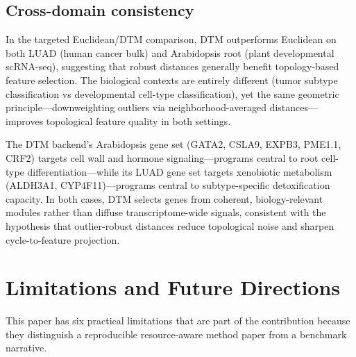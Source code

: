\documentclass[11pt]{article}
\begin{document}
\subsection{Cross-domain consistency}

In the targeted Euclidean/DTM comparison, DTM outperforms Euclidean on both LUAD (human cancer bulk) and Arabidopsis root (plant developmental scRNA-seq), suggesting that robust distances generally benefit topology-based feature selection.
The biological contexts are entirely different (tumor subtype classification vs developmental cell-type classification), yet the same geometric principle---downweighting outliers via neighborhood-averaged distances---improves topological feature quality in both settings.

The DTM backend's Arabidopsis gene set (GATA2, CSLA9, EXPB3, PME1.1, CRF2) targets cell wall and hormone signaling---programs central to root cell-type differentiation---while its LUAD gene set targets xenobiotic metabolism (ALDH3A1, CYP4F11)---programs central to subtype-specific detoxification capacity.
In both cases, DTM selects genes from coherent, biology-relevant modules rather than diffuse transcriptome-wide signals, consistent with the hypothesis that outlier-robust distances reduce topological noise and sharpen cycle-to-feature projection.

\section{Limitations and Future Directions}
\label{sec:limitations}

This paper has six practical limitations that are part of the contribution because they distinguish a reproducible resource-aware method paper from a benchmark narrative.
\end{document}
